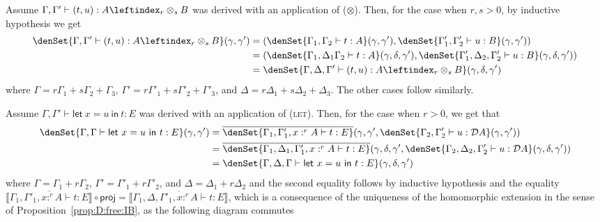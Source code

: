 \documentclass[a4paper,UKenglish,cleveref, autoref, thm-restate]{lipics-v2021}
\newcommand{\mprod}{\otimes}
\newcommand{\pair}[2]{\otimes_{#1,#2}}
\renewcommand{\pair}[2]{\leftindex_{#1}\otimes_{#2}} %
\newcommand{\proj}{\mathsf{proj}}
\newcommand{\ts}{\vdash}
\newcommand{\hastype}[3]{#1\ts #2 : #3}
\newcommand{\letIn}[2]{\mathsf{let~} #1 \mathsf{~in~} #2}
\newcommand{\TD}{\mathcal{D}}
\newcommand{\den}[1]{\llbracket #1\rrbracket}
\begin{document}
\begin{description}[font=\sc,wide]
\item[Case ($\mprod$):] Assume $\hastype{\Gamma,\Gamma'}{(t,u)}{A \pair{r}{s} B}$ was derived with an application of ($\mprod$). 
Then, for the case when $r,s>0$, by inductive hypothesis we get 
\begin{align*}
\denSet{\hastype{\Gamma,\Gamma'}{(t,u)}{A \pair{r}{s} B}}(\gamma,\gamma')
&= (\denSet{\hastype{\Gamma_1,\Gamma_2}{t}{A}}(\gamma,\gamma'),
  \denSet{\hastype{\Gamma'_1, \Gamma'_2}{u}{B}}(\gamma,\gamma') ) \\
&= (\denSet{\hastype{\Gamma_1,\Delta_1\Gamma_2}{t}{A}}(\gamma,\delta,\gamma'),
  \denSet{\hastype{\Gamma'_1,\Delta_2,\Gamma'_2}{u}{B}}(\gamma,\delta,\gamma') ) \\
&= \denSet{\hastype{\Gamma,\Delta,\Gamma'}{(t,u)}{A \pair{r}{s} B}}(\gamma,\delta,\gamma')
\end{align*}
where $\Gamma = r\Gamma_1+s\Gamma_2+\Gamma_3$, $\Gamma' = r\Gamma'_1+s\Gamma'_2+\Gamma'_3$, and $\Delta=r\Delta_1+s\Delta_2+\Delta_3$. The other cases follow similarly.

\item[Case (let):] Assume $\hastype{\Gamma,\Gamma'}{ \letIn{x=u}{t} }{E}$ was derived with an application of (\textsc{let}). Then, for the case when $r>0$, we get that 
\begin{align*}
\denSet{\hastype{\Gamma,\Gamma}{\letIn{x=u}{t}}{E}}(\gamma,\gamma')
&= \overline{\denSet{\hastype{\Gamma_1,\Gamma'_1,x:^rA}{t}{E}}}
    (\gamma,\gamma', 
    \denSet{\hastype{\Gamma_2,\Gamma'_2}{u}{\TD A}}(\gamma,\gamma')) \\
&= \overline{\denSet{\hastype{\Gamma_1,\Delta_1,\Gamma'_1,x:^rA}{t}{E}}}
    (\gamma,\delta,\gamma', 
    \denSet{\hastype{\Gamma_2,\Delta_2,\Gamma'_2}{u}{\TD A}}(\gamma,\delta,\gamma')) \\
&= \denSet{\hastype{\Gamma,\Delta,\Gamma}{\letIn{x=u}{t}}{E}}(\gamma,\delta,\gamma')
\end{align*}
where 
$\Gamma = \Gamma_1+r\Gamma_2$, $\Gamma' = \Gamma'_1+r\Gamma'_2$, and $\Delta=\Delta_1+r\Delta_2$ and the second equality follows by inductive hypothesis and the equality
$
  \overline{\den{\hastype{\Gamma_1,\Gamma'_1,x:^rA}{t}{E}}} \circ \proj
  = 
  \overline{\den{\hastype{\Gamma_1,\Delta,\Gamma'_1,x:^rA}{t}{E}}}
$, which is a consequence of the uniqueness of the homomorphic extension in the sense of  Proposition~\ref{prop:D:free:IB}, as the following diagram commutes
    

\end{description}
\end{document}
